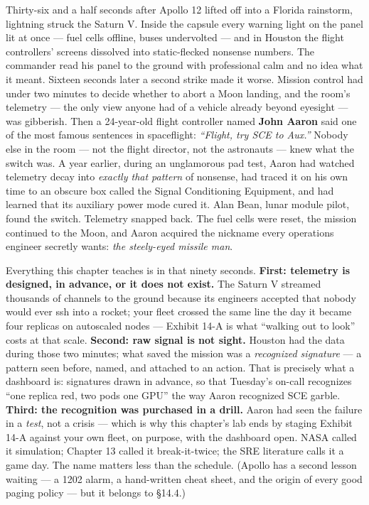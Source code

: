 Thirty-six and a half seconds after Apollo 12 lifted off into a Florida rainstorm, lightning struck the Saturn V. Inside the capsule every warning light on the panel lit at once — fuel cells offline, buses undervolted — and in Houston the flight controllers’ screens dissolved into static-flecked nonsense numbers. The commander read his panel to the ground with professional calm and no idea what it meant. Sixteen seconds later a second strike made it worse. Mission control had under two minutes to decide whether to abort a Moon landing, and the room’s telemetry — the only view anyone had of a vehicle already beyond eyesight — was gibberish. Then a 24-year-old flight controller named \textbf{John Aaron} said one of the most famous sentences in spaceflight: \textit{“Flight, try SCE to Aux.”} Nobody else in the room — not the flight director, not the astronauts — knew what the switch was. A year earlier, during an unglamorous pad test, Aaron had watched telemetry decay into \textit{exactly that pattern} of nonsense, had traced it on his own time to an obscure box called the Signal Conditioning Equipment, and had learned that its auxiliary power mode cured it. Alan Bean, lunar module pilot, found the switch. Telemetry snapped back. The fuel cells were reset, the mission continued to the Moon, and Aaron acquired the nickname every operations engineer secretly wants: \textit{the steely-eyed missile man}.

Everything this chapter teaches is in that ninety seconds. \textbf{First: telemetry is designed, in advance, or it does not exist.} The Saturn V streamed thousands of channels to the ground because its engineers accepted that nobody would ever ssh into a rocket; your fleet crossed the same line the day it became four replicas on autoscaled nodes — Exhibit 14-A is what “walking out to look” costs at that scale. \textbf{Second: raw signal is not sight.} Houston had the data during those two minutes; what saved the mission was a \textit{recognized signature} — a pattern seen before, named, and attached to an action. That is precisely what a dashboard is: signatures drawn in advance, so that Tuesday’s on-call recognizes “one replica red, two pods one GPU” the way Aaron recognized SCE garble. \textbf{Third: the recognition was purchased in a drill.} Aaron had seen the failure in a \textit{test}, not a crisis — which is why this chapter’s lab ends by staging Exhibit 14-A against your own fleet, on purpose, with the dashboard open. NASA called it simulation; Chapter 13 called it break-it-twice; the SRE literature calls it a game day. The name matters less than the schedule. (Apollo has a second lesson waiting — a 1202 alarm, a hand-written cheat sheet, and the origin of every good paging policy — but it belongs to §14.4.)


